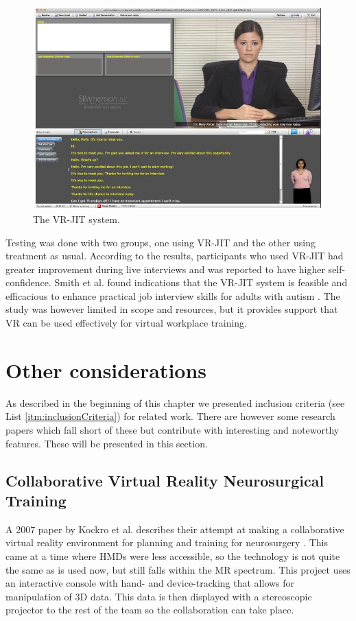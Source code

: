 \begin{figure}[!ht]
     \centering
     \includegraphics[width=.7\textwidth]{fig/related_work/vr-jit.jpg}
     \captionsetup{width=0.7\linewidth}
     \caption{The VR-JIT system.}
     \label{fig:vr-jit}
 \end{figure}
 
Testing was done with two groups, one using VR-JIT and the other using treatment as usual. According to the results, participants who used VR-JIT had greater improvement during live interviews and was reported to have higher self-confidence. Smith et al. found indications that the VR-JIT system is feasible and efficacious  to enhance practical job interview skills for adults with autism \cite{smith2014virtual}. The study was however limited in scope and resources, but it provides support that VR can be used effectively for virtual workplace training.  



\section{Other considerations}
As described in the beginning of this chapter  we presented inclusion criteria (see List \ref{itm:inclusionCriteria}) for related work. There are however some research papers which fall short of these but contribute with interesting and noteworthy features. These will be presented in this section.     

\subsection{Collaborative Virtual Reality Neurosurgical Training}
A 2007 paper by Kockro et al. describes their attempt at making a collaborative virtual reality environment for planning and training for neurosurgery \cite{kockro2007collaborative}. This came at a time where HMDs were less accessible, so the technology is not quite the same as is used now, but still falls within the MR spectrum. This project uses an interactive console with hand- and device-tracking that allows for manipulation of 3D data. This data is then displayed with a stereoscopic projector to the rest of the team so the collaboration can take place.

